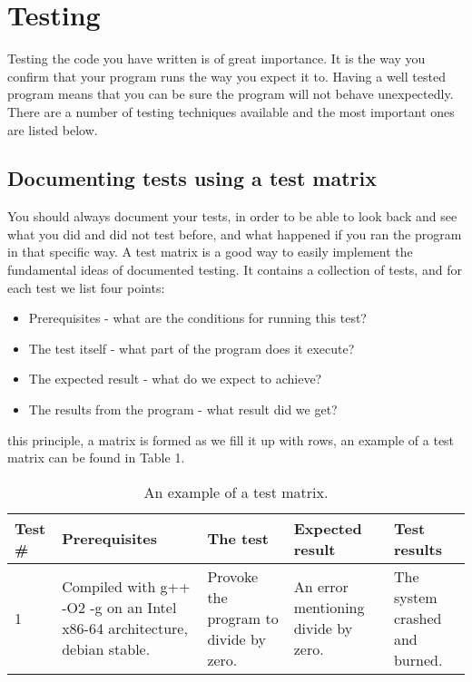 \documentclass[11pt,a4paper,twoside]{article}
\begin{document}

\section{Testing}

Testing the code you have written is of great importance. It is the way you
confirm that your program runs the way you expect it to. Having a well tested
program means that you can be sure the program will not behave unexpectedly.
There are a number of testing techniques available and the most important ones
are listed below.


\subsection{Documenting tests using a test matrix}

You should always document your tests, in order to be able to look back and see
what you did and did not test before, and what happened if you ran the
program in that specific way. A test matrix is a good way to easily implement the
fundamental ideas of documented testing. It contains a collection of tests, and
for each test we list four points:

\begin{itemize}
    \item Prerequisites - what are the conditions for running this test?
    \item The test itself - what part of the program does it execute?
    \item The expected result - what do we expect to achieve?
    \item The results from the program - what result did we get?
\end{itemize}

 this principle, a matrix is formed as we fill it up with
rows, an example of a test matrix can be found in Table 1.

\begin{center}
\begin{table}[h!]
\begin{tabular}{|l|p{2.5cm}|p{2cm}|p{2.5cm}|p{2.5cm}|}
\hline
Test \# & Prerequisites & The test & Expected result & Test results \\ \hline 1
& Compiled with g++ -O2 -g on an Intel x86-64 architecture, debian stable. &
Provoke the program to divide by zero. & An error mentioning divide by zero. &
The system crashed and burned. \\
\hline
\end{tabular}
\caption{An example of a test matrix.}
\end{table}
\end{center}
\end{document}
